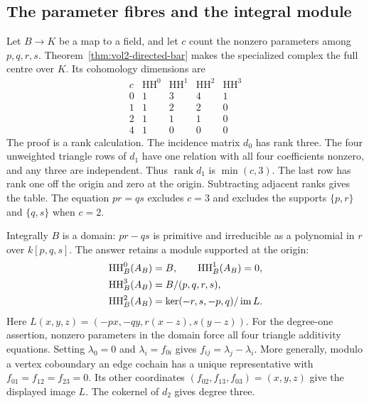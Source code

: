 \subsection{The parameter fibres and the integral module}

Let $B\to K$ be a map to a field, and let $c$ count the nonzero
parameters among $p,q,r,s$. Theorem~\ref{thm:vol2-directed-bar}
makes the specialized complex the full centre over $K$.
Its cohomology dimensions are
\begin{equation}\label{eq:vol2-four-fibres}
 \begin{array}{c|rrrr}
 c&\operatorname{HH}^0&\operatorname{HH}^1&
          \operatorname{HH}^2&\operatorname{HH}^3\\\hline
 0&1&3&4&1\\
 1&1&2&2&0\\
 2&1&1&1&0\\
 4&1&0&0&0
 \end{array}
\end{equation}
The proof is a rank calculation. The incidence matrix $d_0$
has rank three. The four unweighted triangle rows of $d_1$
have one relation with all four coefficients nonzero, and
any three are independent. Thus $\operatorname{rank}d_1$
is $\min(c,3)$. The last row has rank one off the origin
and zero at the origin. Subtracting adjacent ranks gives
the table. The equation $pr=qs$ excludes $c=3$ and excludes
the supports $\{p,r\}$ and $\{q,s\}$ when $c=2$.

Integrally $B$ is a domain: $pr-qs$ is primitive and
irreducible as a polynomial in $r$ over $k[p,q,s]$.
The answer retains a module supported at the origin:
\begin{align}\label{eq:vol2-four-integral}
 \operatorname{HH}_B^0(A_B)&=B,\qquad
 \operatorname{HH}_B^1(A_B)=0,\notag\\
 \operatorname{HH}_B^3(A_B)&=B/(p,q,r,s),\notag\\
 \operatorname{HH}_B^2(A_B)&=
   \ker(-r,s,-p,q)/\operatorname{im}L.
\end{align}
Here $L(x,y,z)=(-px,-qy,r(x-z),s(y-z))$.
For the degree-one assertion, nonzero parameters in the domain
force all four triangle additivity equations. Setting
$\lambda_0=0$ and $\lambda_i=f_{0i}$ gives
$f_{ij}=\lambda_j-\lambda_i$. More generally, modulo a
vertex coboundary an edge cochain has a unique representative
with $f_{01}=f_{12}=f_{23}=0$. Its other coordinates
$(f_{02},f_{13},f_{03})=(x,y,z)$ give the displayed image
$L$. The cokernel of $d_2$ gives degree three.

